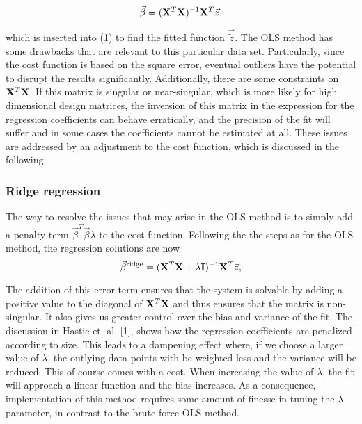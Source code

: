\documentclass{emulateapj}
\begin{document}
\begin{equation}
\vec{\beta}=(\bold{X}^T\bold{X})^{-1}\bold{X}^T\vec{z},
\end{equation}

which is inserted into (1) to find the fitted function $\vec{\tilde{z}}$. The OLS method has some drawbacks that are relevant to this particular data set. Particularly, since the cost function is based on the square error, eventual outliers have the potential to disrupt the results significantly. Additionally, there are some constraints on $\bold{X}^T\bold{X}$. If this matrix is singular or near-singular, which is more likely for high dimensional design matrices, the inversion of this matrix in the expression for the regression coefficients can behave erratically, and the precision of the fit will suffer and in some cases the coefficients cannot be estimated at all. These issues are addressed by an adjustment to the cost function, which is discussed in the following. 


\subsubsection{Ridge regression}
The way to resolve the issues that may arise in the OLS method is to  simply add a penalty term $\vec{\beta}^T\vec{\beta} \lambda$ to the cost function. Following the the steps as for the OLS method, the regression solutions are now 
\begin{equation}
\vec{\beta}^{\text{ridge}}=(\bold{X}^T\bold{X} + \lambda \bold{I})^{-1}\bold{X}^T\vec{z},
\end{equation}

The addition of this error term ensures that the system is solvable by adding a positive value to the diagonal of $\bold{X}^T\bold{X}$ and thus ensures that the matrix is non-singular. It also gives us greater control over the bias and variance of the fit. The discussion in Hastie et. al. [1], shows how the regression coefficients are penalized according to size. This leads to a dampening effect where, if we choose a larger value of $\lambda$, the outlying data points with be weighted less and the variance will be reduced. This of course comes with a cost. When increasing the value of $\lambda$, the fit will approach a linear function and the bias increases. As a consequence, implementation of this method requires some amount of finesse in tuning the $\lambda $ parameter, in contrast to the brute force OLS method.
\end{document}
